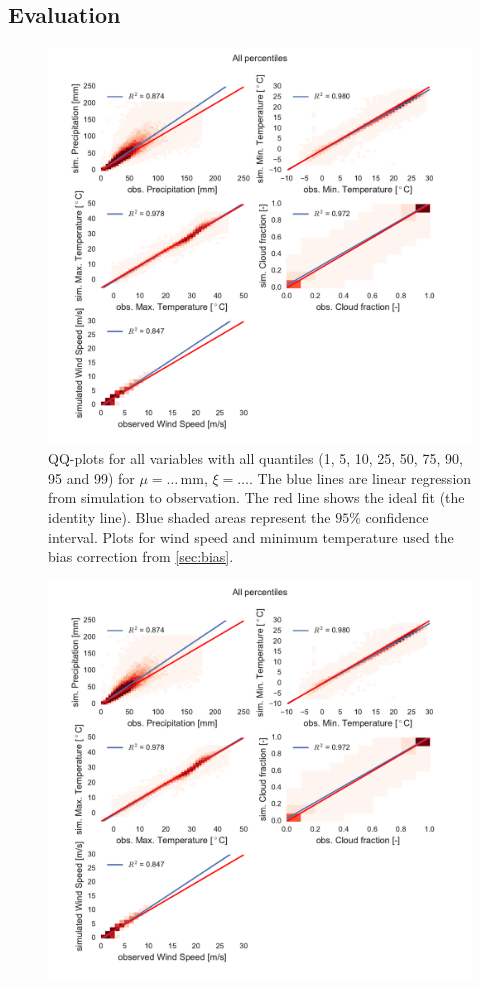 \begin{refsection}
\subsection{Evaluation} \label{sec:eval}
\begin{figure}
	\includegraphics[width=12cm, page=1]{figures/quants.pdf}
	\caption[QQ-plots for all variables and all quantiles]{QQ-plots for all variables with all quantiles (1, 5, 10, 25, 50, 75, 90, 95 and 99) for ${\mu=\ldots\, \mathrm{mm}}$, $\xi=\ldots$. The blue lines are linear regression from simulation to observation. The red line shows the ideal fit (the identity line). Blue shaded areas represent the $95\%$ confidence interval. Plots for wind speed and minimum temperature used the bias correction from \autoref{sec:bias}.}
	\label{fig:all_quants}
\end{figure}
\begin{figure}
	\includegraphics[width=12cm, page=3]{figures/quants.pdf}

\end{figure}
\end{refsection}
